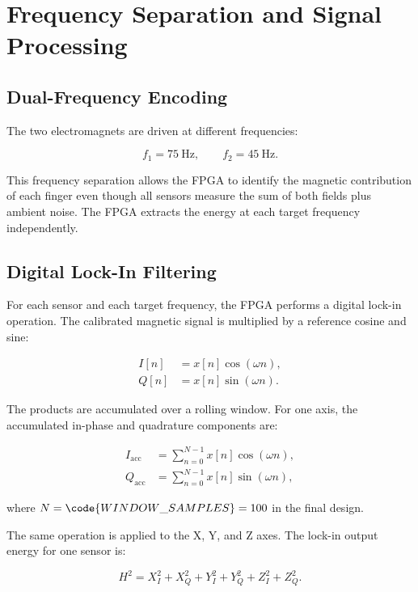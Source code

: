\section{Frequency Separation and Signal Processing}
\label{sec:signal_processing}

\subsection{Dual-Frequency Encoding}

The two electromagnets are driven at different frequencies:

\begin{equation}
    f_1 = 75~\mathrm{Hz}, \qquad f_2 = 45~\mathrm{Hz}.
\end{equation}

This frequency separation allows the FPGA to identify the magnetic contribution of each finger even though all sensors measure the sum of both fields plus ambient noise. The FPGA extracts the energy at each target frequency independently.

\subsection{Digital Lock-In Filtering}

For each sensor and each target frequency, the FPGA performs a digital lock-in operation. The calibrated magnetic signal is multiplied by a reference cosine and sine:

\begin{align}
    I[n] &= x[n]\cos(\omega n), \\
    Q[n] &= x[n]\sin(\omega n).
\end{align}

The products are accumulated over a rolling window. For one axis, the accumulated in-phase and quadrature components are:

\begin{align}
    I_{\mathrm{acc}} &= \sum_{n=0}^{N-1} x[n]\cos(\omega n), \\
    Q_{\mathrm{acc}} &= \sum_{n=0}^{N-1} x[n]\sin(\omega n),
\end{align}

where $N=\code{WINDOW\_SAMPLES}=100$ in the final design.

The same operation is applied to the X, Y, and Z axes. The lock-in output energy for one sensor is:

\begin{equation}
    H^2 =
    X_I^2 + X_Q^2 +
    Y_I^2 + Y_Q^2 +
    Z_I^2 + Z_Q^2.
    \label{eq:h2_lockin}
\end{equation}

